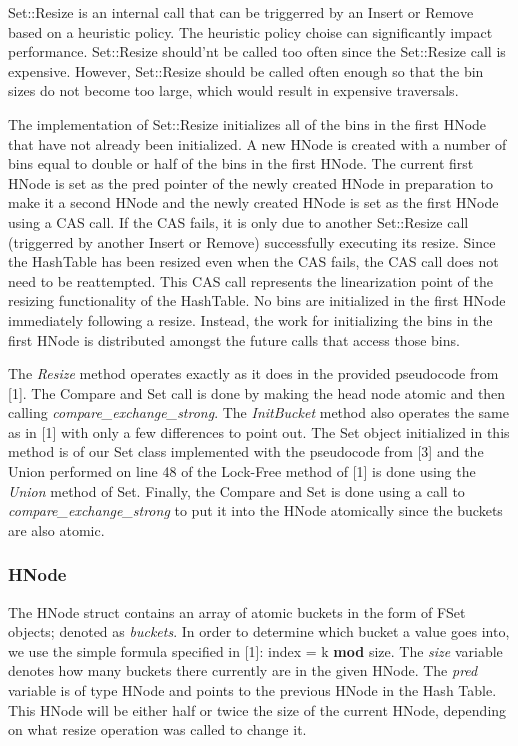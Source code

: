\documentclass[11pt]{article} %
\begin{document}
Set::Resize is an internal call that can be triggerred by an Insert or Remove based on a heuristic policy. The heuristic policy choise can significantly impact performance. Set::Resize should'nt be called too often since the Set::Resize call is expensive. However, Set::Resize should be called often enough so that the bin sizes do not become too large, which would result in expensive traversals.

The implementation of Set::Resize initializes all of the bins in the first HNode that have not already been initialized. A new HNode is created with a number of bins equal to double or half of the bins in the first HNode. The current first HNode is set as the pred pointer of the newly created HNode in preparation to make it a second HNode and the newly created HNode is set as the first HNode using a CAS call. If the CAS fails, it is only due to another Set::Resize call (triggerred by another Insert or Remove) successfully executing its resize. Since the HashTable has been resized even when the CAS fails, the CAS call does not need to be reattempted. This CAS call represents the linearization point of the resizing functionality of the HashTable. No bins are initialized in the first HNode immediately following a resize. Instead, the work for initializing the bins in the first HNode is distributed amongst the future calls that access those bins.



The \textit{Resize} method operates exactly as it does in the provided pseudocode from [1]. The Compare and Set call is done by making the head node atomic and then calling \textit{compare\_exchange\_strong}. The \textit{InitBucket} method also operates the same as in [1] with only a few differences to point out. The Set object initialized in this method is of our Set class implemented with the pseudocode from [3] and the Union performed on line 48 of the Lock-Free method of [1] is done using the \textit{Union} method of Set. Finally, the Compare and Set is done using a call to \textit{compare\_exchange\_strong} to put it into the HNode atomically since the buckets are also atomic. 

\subsubsection{HNode}

The HNode struct contains an array of atomic buckets in the form of FSet objects; denoted as \textit{buckets}. In order to determine which bucket a value goes into, we use the simple formula specified in [1]: index = k \textbf{mod} size. The \textit{size} variable denotes how many buckets there currently are in the given HNode. The \textit{pred} variable is of type HNode and points to the previous HNode in the Hash Table. This HNode will be either half or twice the size of the current HNode, depending on what resize operation was called to change it.
\end{document}

